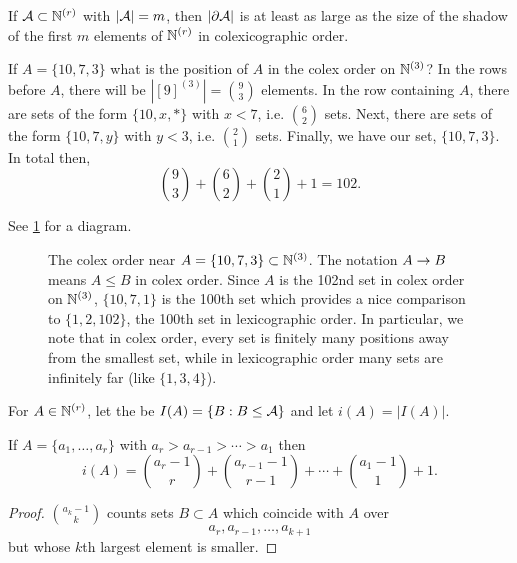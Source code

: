 \begin{theorem} \label{thm:kruskal_katona}
If $\mathcal{A}\subset \mathbb{N}^{(r)}$ with $|\mathcal{A}| = m$, then $|\partial \mathcal{A}|$ is at least as large as the size of the shadow of the first $m$ elements of $\mathbb{N}^{(r)}$ in colexicographic order.
\end{theorem}
\begin{example}
If $A= \{10,7,3\}$ what is the position of $A$ in the colex order on $\mathbb{N}^{(3)}$? In the rows before $A$, there will be $|[9]^{(3)}| ={9\choose 3}$ elements.  In the row containing $A$, there are sets of the form $\{10,x,*\}$ with $x<7$, i.e. ${6\choose 2}$ sets. Next, there are sets of the form $\{10,7,y\}$ with $y<3$, i.e. ${2\choose 1}$ sets. Finally, we have our set, $\{10,7,3\}$. In total then,
\[
{9\choose 3} + {6\choose 2} + {2\choose 1} + 1 = 102.
\]

See \cref{fig:colex_near_A} for a diagram.
\begin{figure*}[ht]
\begin{center}
\caption{The colex order near $A=\{10,7,3\} \subset \mathbb{N}^{(3)}$. The notation $A\rightarrow B$ means $A\leq B$ in colex order. Since $A$ is the 102nd set in colex order on $\mathbb{N}^{(3)}$, $\{10,7,1\}$ is the 100th set which provides a nice comparison to $\{1,2,102\}$, the 100th set in lexicographic order. In particular, we note that in colex order, every set is finitely many positions away from the smallest set, while in lexicographic order many sets are infinitely far (like $\{1,3,4\}$).}\label{fig:colex_near_A}
\end{center}

\end{figure*}
\end{example}


For $A\in \mathbb{N}^{(r)}$, let the  be $I(A) =\{B: B\leq \mathcal{A}\}$ and let $i(A) = |I(A)|$. 
\begin{lemma}
If $A = \{a_1,\dotsc,a_r\}$ with $a_r>a_{r-1}>\dotsb> a_1$ then 
\[
i(A) = {a_{r}-1\choose r} + {a_{r-1}-1 \choose r-1} + \dotsb + {a_1-1 \choose 1} + 1.
\]
\end{lemma}
\begin{proof}	
${a_{k} -1\choose k}$ counts sets $B\subset A$ which coincide with $A$ over 
\[
 a_r,a_{r-1},\dotsc,a_{k+1}
\]
  but whose $k$th largest element is smaller.
\end{proof}

